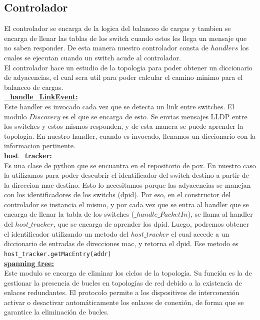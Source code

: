 \subsection{Controlador}
	El controlador se encarga de la logica del balanceo de cargas y tambien se encarga de llenar las tablas de los switch cuando estos les 		llega un mensaje que no saben responder. De esta manera nuestro controlador consta de $handlers$ los cuales se ejecutan cuando un 		switch acude al controlador.\\
	El controlador hace un estudio de la topologia para poder obtener un diccionario de adyacencias, el cual sera util para poder calcular 		el camino minimo para el balanceo de cargas.\\
	\underline{\textbf{\_handle\_LinkEvent:}}\\
		Este handler es invocado cada vez que se detecta un link entre switches. El modulo $Discovery$ es el que se encarga de esto. Se 		envias mensajes LLDP entre los switches y estos mismos responden, y de esta manera se puede aprender la topologia. En nuestro 			handler, cuando es invocado, llenamos un diccionario con la informacion pertinente.\\
	\underline{\textbf{host\_tracker:}}\\
		Es una clase de python que se encuantra en el repositorio de pox. En nuestro caso la utilizamos para poder descubrir el 		identificador del switch destino a partir de la direccion mac destino. Esto lo necesitamos porque las adyacencias se manejan 			con los identificadores de los switchs (dpid). Por eso, en el constructor del controlador se instancia el mismo, y por cada vez 		que se entra al handler que se encarga de llenar la tabla de los switches ($\_handle\_PacketIn$), se llama al handler del 			$host\_tracker$, que se encarga de aprender los dpid. Luego, podremos obtener el identificador utilizando un metodo del 		$host\_tracker$ el cual accede a un diccionario de entradas de direcciones mac, y retorna el dpid. Ese metodo es \lstinline[columns=fixed]{host_tracker.getMacEntry(addr)}\\
	\underline{\textbf{spanning tree:}}\\
		Este modulo se encarga de eliminar los ciclos de la topologia. Su función es la de gestionar la presencia de bucles en 			topologías de red debido a la existencia de enlaces redundantes. El protocolo permite a los dispositivos de interconexión 			activar o desactivar automáticamente los enlaces de conexión, de forma que se garantice la eliminación de bucles.\\
